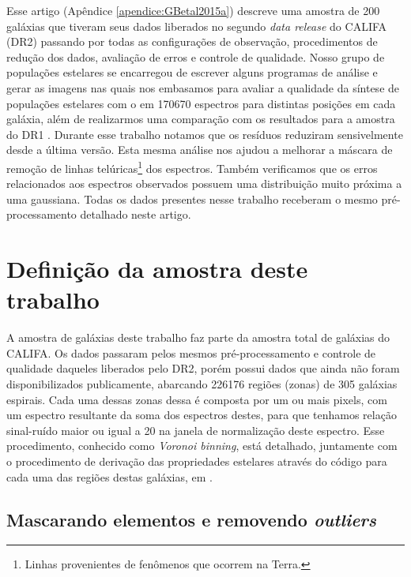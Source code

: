 Esse artigo (Apêndice \ref{apendice:GBetal2015a}) descreve uma amostra de 200 galáxias que tiveram
seus dados liberados no segundo {\em data release} do CALIFA (DR2) passando por todas as
configurações de observação, procedimentos de redução dos dados, avaliação de erros e controle de
qualidade. Nosso grupo de populações estelares se encarregou de escrever alguns programas de análise
e gerar as imagens nas quais nos embasamos para avaliar a qualidade da síntese de populações
estelares com o \starlight em 170670 espectros para distintas posições em cada galáxia, além de
realizarmos uma comparação com os resultados para a amostra do DR1 \citep{Husemann.etal.2013a}.
Durante esse trabalho notamos que os resíduos reduziram sensivelmente desde a última versão. Esta
mesma análise nos ajudou a melhorar a máscara de remoção de linhas telúricas\footnote{Linhas
provenientes de fenômenos que ocorrem na Terra.} dos espectros. Também verificamos que os erros
relacionados aos espectros observados possuem uma distribuição muito próxima a uma gaussiana. Todas
os dados presentes nesse trabalho receberam o mesmo pré-processamento detalhado neste artigo.

\section{Definição da amostra deste trabalho}
\label{sec:amostra:definicao}

A amostra de galáxias deste trabalho faz parte da amostra total de galáxias do CALIFA. Os dados
passaram pelos mesmos pré-processamento e controle de qualidade daqueles liberados pelo DR2, porém
possui dados que ainda não foram disponibilizados publicamente, abarcando 226176 regiões (zonas) de
305 galáxias espirais. Cada uma dessas zonas dessa é composta por um ou mais pixels, com um espectro
resultante da soma dos espectros destes, para que tenhamos relação sinal-ruído maior ou igual a 20
na janela de normalização deste espectro. Esse procedimento, conhecido como {\em Voronoi binning},
está detalhado, juntamente com o procedimento de derivação das propriedades estelares através do
código \starlight para cada uma das regiões destas galáxias, em \citet{CidFernandes.etal.2013a}.

\subsection{Mascarando elementos e removendo {\em outliers}}
\label{sec:amostra:mask}

